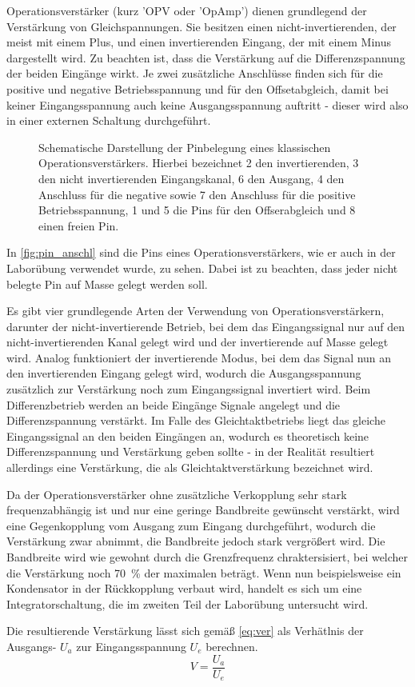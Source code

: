Operationsverstärker (kurz 'OPV oder 'OpAmp') dienen grundlegend der Verstärkung von 
Gleichspannungen. Sie besitzen einen nicht-invertierenden, der meist mit einem 
Plus, und einen invertierenden Eingang, der mit einem Minus dargestellt wird. Zu 
beachten ist, dass die Verstärkung auf die Differenzspannung der beiden Eingänge 
wirkt. Je zwei zusätzliche Anschlüsse finden sich für die positive und negative 
Betriebsspannung und für den Offsetabgleich, damit bei keiner Eingangsspannung 
auch keine Ausgangsspannung auftritt - dieser wird also in einer externen 
Schaltung durchgeführt.

\begin{figure}[H]
    \centering
    \caption{Schematische Darstellung der Pinbelegung eines klassischen Operationsverstärkers. Hierbei bezeichnet 2 den invertierenden, 3 den nicht invertierenden Eingangskanal, 6 den Ausgang, 4 den Anschluss für die negative sowie 7 den Anschluss für die positive Betriebsspannung, 1 und 5 die Pins für den Offserabgleich und 8 einen freien Pin.  \cite{tietze}}
    \label{fig:pin_anschl}
\end{figure}

In \autoref{fig:pin_anschl} sind die Pins eines Operationsverstärkers, wie er auch 
in der Laborübung verwendet wurde, zu sehen. Dabei ist zu beachten, dass jeder nicht 
belegte Pin auf Masse gelegt werden soll.

Es gibt vier grundlegende Arten der Verwendung von Operationsverstärkern, darunter
der nicht-invertierende Betrieb, bei dem das Eingangssignal nur auf den nicht-invertierenden 
Kanal gelegt wird und der invertierende auf Masse gelegt wird. Analog funktioniert der invertierende 
Modus, bei dem das Signal nun an den invertierenden Eingang gelegt wird, wodurch die Ausgangsspannung 
zusätzlich zur Verstärkung noch zum Eingangssignal invertiert wird. Beim Differenzbetrieb werden an 
beide Eingänge Signale angelegt und die Differenzspannung verstärkt. Im Falle des Gleichtaktbetriebs 
liegt das gleiche Eingangssignal an den beiden Eingängen an, wodurch es theoretisch keine Differenzspannung 
und Verstärkung geben sollte - in der Realität resultiert allerdings eine Verstärkung, die als 
Gleichtaktverstärkung bezeichnet wird.

Da der Operationsverstärker ohne zusätzliche Verkopplung sehr stark frequenzabhängig ist und 
nur eine geringe Bandbreite gewünscht verstärkt, wird eine Gegenkopplung vom Ausgang zum Eingang 
durchgeführt, wodurch die Verstärkung zwar abnimmt, die Bandbreite jedoch stark vergrößert wird. 
Die Bandbreite wird wie gewohnt durch die Grenzfrequenz chraktersisiert, bei welcher die Verstärkung 
noch \SI{70}{\%} der maximalen beträgt. Wenn nun beispielsweise ein Kondensator in der Rückkopplung verbaut wird, 
handelt es sich um eine Integratorschaltung, die im zweiten Teil der Laborübung untersucht wird.

Die resultierende Verstärkung lässt sich gemäß \autoref{eq:ver} als Verhätlnis der Ausgangs- $U_a$ zur Eingangsspannung $U_e$ berechnen.
\begin{equation}
	V=\frac{U_a}{U_e}
	\label{eq:ver}
\end{equation}
